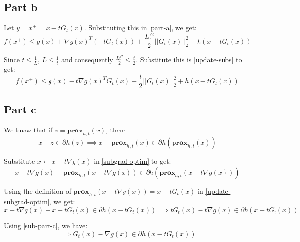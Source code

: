 \documentclass[11pt]{article}
\begin{document}
\subsection*{Part b}
\begin{flushleft}
Let \(y = x^{+} = x - tG_{t}(x)\). Substituting this in \ref{part-a}, we get:
\begin{equation}
\label{update-subs}
f(x^{+}) \leq g(x) + \nabla g(x)^{T}(-tG_{t}(x)) + \frac{Lt^{2}}{2}||G_{t}(x)||_{2}^{2} + h\left(x - tG_{t}(x)\right)
\end{equation}

Since \(t \leq \frac{1}{L}\), \(L \leq \frac{1}{t}\) and consequently \(\frac{Lt^2}{2} \leq \frac{t}{2}\). Substitute this is \ref{update-subs} to get:
\begin{equation}
\label{part-b}
f(x^{+}) \leq g(x) - t\nabla g(x)^TG_{t}(x) + \frac{t}{2}||G_{t}(x)||_{2}^{2} + h\left(x - tG_{t}(x)\right)
\end{equation}
\end{flushleft}

\subsection*{Part c}
\begin{flushleft}
We know that if \(z = \textbf{prox}_{h, t}(x)\), then:
\begin{equation}
\label{subgrad-optim}
x - z \in \partial h(z) \implies x - \textbf{prox}_{h, t}(x) \in \partial h(\textbf{prox}_{h, t}(x))
\end{equation}

Substitute \(x \leftarrow x - t\nabla g(x)\) in \ref{subgrad-optim} to get:
\begin{equation}
\label{update-subgrad-optim}
x - t\nabla g(x) - \textbf{prox}_{h, t}(x - t\nabla g(x)) \in \partial h(\textbf{prox}_{h, t}(x - t\nabla g(x)))
\end{equation}

Using the definition of \(\textbf{prox}_{h, t}(x - t\nabla g(x)) = x - tG_{t}(x)\) in \ref{update-subgrad-optim}, we get:
\begin{equation}
\label{sub-part-c}
x - t\nabla g(x) - x + tG_{t}(x) \in \partial h(x - tG_{t}(x)) \implies tG_{t}(x) - t\nabla g(x) \in \partial h(x - tG_{t}(x)) 
\end{equation}

Using \ref{sub-part-c}, we have:
\begin{equation}
\label{part-c}
\implies G_{t}(x) - \nabla g(x) \in \partial h(x - tG_{t}(x))
\end{equation}
\end{flushleft}
\end{document}
